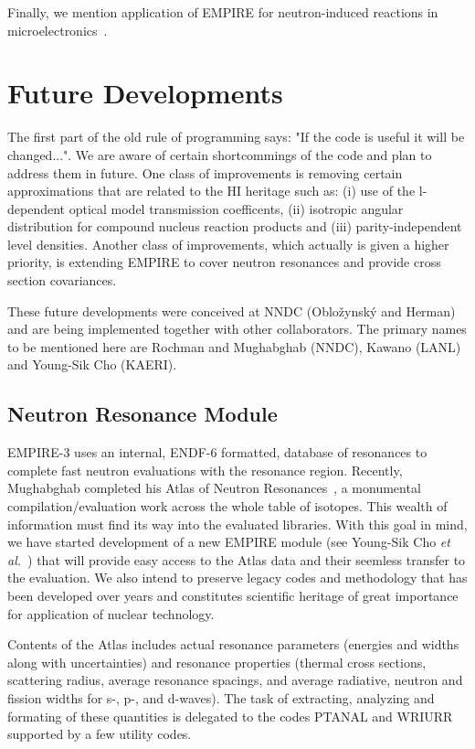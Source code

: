 \documentclass[twocolumn,amsmath,amssymb,10pt,groupedaddress,letter]{revtex4}
\begin{document}
Finally, we mention application of EMPIRE  for neutron-induced reactions in microelectronics~\cite{wrobel2005unc}.



\section{Future Developments}

The first part of the old rule of programming says: "If the code is useful it will be changed...". We are aware of certain shortcommings of the code and plan to address them in future.  One class of improvements is removing certain approximations that are related to the HI heritage such as: (i) use of the l-dependent optical model transmission coefficents, (ii) isotropic angular distribution for compound nucleus reaction products and (iii) parity-independent level densities. Another class of improvements, which actually is given a higher priority, is extending EMPIRE to cover neutron resonances and provide cross section covariances.

These future developments were conceived at NNDC (Oblo\v zynsk\' y and Herman) and are being implemented together with  other collaborators. The primary names to be mentioned here are Rochman and Mughabghab (NNDC), Kawano (LANL) and Young-Sik Cho (KAERI).

\subsection{Neutron Resonance Module}
EMPIRE-3 uses an internal, ENDF-6 formatted, database of resonances to complete fast neutron evaluations with the resonance region. Recently,  Mughabghab completed his Atlas of Neutron Resonances~\cite{Mughabghab:06}, a monumental compilation/evaluation work across the whole table of isotopes. This wealth of information must find its way into the evaluated libraries. With this goal in mind, we have started development of a new EMPIRE module (see Young-Sik Cho \textit{et al.}~\cite{Cho:07}) that will provide easy access to the Atlas data and their seemless transfer to the evaluation. We also intend to preserve legacy codes and methodology that has been developed over years and constitutes scientific heritage of great importance for application of nuclear technology.

Contents of the Atlas includes actual resonance parameters (energies and widths along with uncertainties) and resonance properties  (thermal cross sections, scattering radius, average resonance spacings, and average radiative, neutron and fission widths for s-, p-, and d-waves). The task of extracting, analyzing and formating of these quantities is delegated to the codes PTANAL and WRIURR~\cite{Oh:00} supported by a few utility codes.
\end{document}
